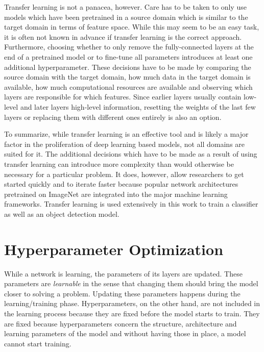 \documentclass[draft,final]{vutinfth} %
\begin{document}
Transfer learning is not a panacea, however. Care has to be taken to
only use models which have been pretrained in a source domain which is
similar to the target domain in terms of feature space. While this may
seem to be an easy task, it is often not known in advance if transfer
learning is the correct approach. Furthermore, choosing whether to
only remove the fully-connected layers at the end of a pretrained
model or to fine-tune all parameters introduces at least one
additional hyperparameter. These decisions have to be made by
comparing the source domain with the target domain, how much data in
the target domain is available, how much computational resources are
available and observing which layers are responsible for which
features. Since earlier layers usually contain low-level and later
layers high-level information, resetting the weights of the last few
layers or replacing them with different ones entirely is also an
option.

To summarize, while transfer learning is an effective tool and is
likely a major factor in the proliferation of deep learning based
models, not all domains are suited for it. The additional decisions
which have to be made as a result of using transfer learning can
introduce more complexity than would otherwise be necessary for a
particular problem. It does, however, allow researchers to get started
quickly and to iterate faster because popular network architectures
pretrained on ImageNet are integrated into the major machine learning
frameworks. Transfer learning is used extensively in this work to
train a classifier as well as an object detection model.

\section{Hyperparameter Optimization}
\label{sec:background-hypopt}

While a network is learning, the parameters of its layers are
updated. These parameters are \emph{learnable} in the sense that
changing them should bring the model closer to solving a
problem. Updating these parameters happens during the
learning/training phase. Hyperparameters, on the other hand, are not
included in the learning process because they are fixed before the
model starts to train. They are fixed because hyperparameters concern
the structure, architecture and learning parameters of the model and
without having those in place, a model cannot start training.
\end{document}
